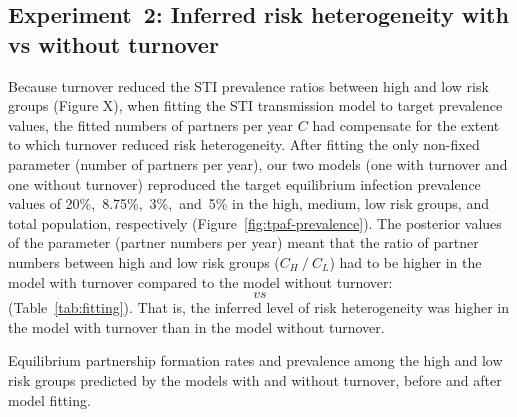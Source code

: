 \subsection{Experiment~2: Inferred risk heterogeneity with vs without turnover}
\label{ss:res-infer}
Because turnover reduced the STI prevalence ratios  between
high and low risk groups (Figure X), 
when fitting the STI transmission model to target prevalence values,
the fitted numbers of partners per year $C$ had compensate for the
extent to which turnover reduced risk heterogeneity.
After fitting the only non-fixed parameter (number of partners per year), 
our two models (one with turnover and one without turnover) reproduced
the target equilibrium infection prevalence values of 20\%,~8.75\%,~3\%,~and~5\%
in the high, medium, low risk groups, and total population, respectively			%
(Figure~\ref{fig:tpaf-prevalence}).
The posterior values of the parameter (partner numbers per year) 
meant that the ratio of partner numbers
between high and low risk groups ($C_H~/~C_L$)
had to be higher in the model with turnover compared to the model without turnover:
$$~vs~%
$$
(Table~\ref{tab:fitting}).
That is, the inferred level of risk heterogeneity was higher
in the model with turnover than in the model without turnover.
\begin{table}
  \centering
  \caption{Equilibrium partnership formation rates and prevalence
    among the high and low risk groups
    predicted by the models with and without turnover,
    before and after model fitting.}
  \label{tab:fitting}
  
\end{table}
